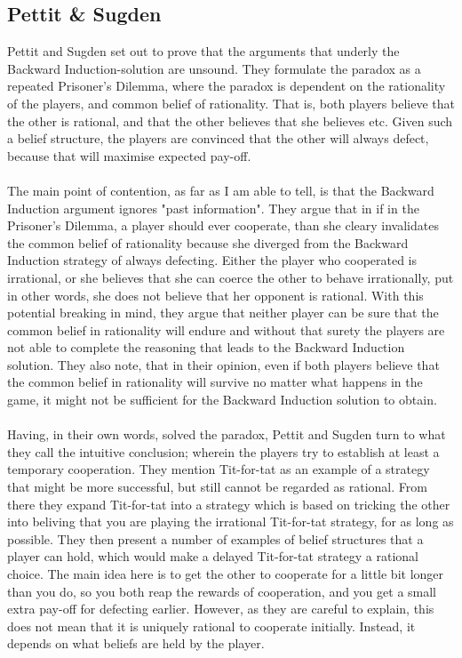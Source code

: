 \documentclass{article}
\begin{document}
\subsection{Pettit \& Sugden}
Pettit and Sugden set out to prove that the arguments that underly the Backward Induction-solution are unsound. They formulate the paradox as a repeated Prisoner's Dilemma, where the paradox is dependent on the rationality of the players, and common belief of rationality. That is, both players believe that the other is rational, and that the other believes that she believes etc. Given such a belief structure, the players are convinced that the other will always defect, because that will maximise expected pay-off.
\\
\\
The main point of contention, as far as I am able to tell, is that the Backward Induction argument ignores "past information". They argue that in if in the Prisoner's Dilemma, a player should ever cooperate, than she cleary invalidates the common belief of rationality because she diverged from the Backward Induction strategy of always defecting. Either the player who cooperated is irrational, or she believes that she can coerce the other to behave irrationally, put in other words, she does not believe that her opponent is rational. With this potential breaking in mind, they argue that neither player can be sure that the common belief in rationality will endure and without that surety the players are not able to complete the reasoning that leads to the Backward Induction solution. They also note, that in their opinion, even if both players believe that the common belief in rationality will survive no matter what happens in the game, it might not be sufficient for the Backward Induction solution to obtain.
\\
\\
Having, in their own words, solved the paradox, Pettit and Sugden turn to what they call the intuitive conclusion; wherein the players try to establish at least a temporary cooperation. They mention Tit-for-tat as an example of a strategy that might be more successful, but still cannot be regarded as rational. From there they expand Tit-for-tat into a strategy which is based on tricking the other into beliving that you are playing the irrational Tit-for-tat strategy, for as long as possible. They then present a number of examples of belief structures that a player can hold, which would make a delayed Tit-for-tat strategy a rational choice. The main idea here is to get the other to cooperate for a little bit longer than you do, so you both reap the rewards of cooperation, and you get a small extra pay-off for defecting earlier. However, as they are careful to explain, this does not mean that it is uniquely rational to cooperate initially. Instead, it depends on what beliefs are held by the player. 
\end{document}
